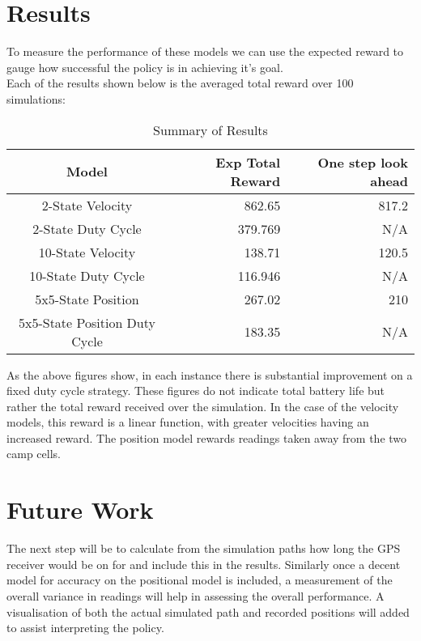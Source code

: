 \documentclass[12pt,openany,a4paper]{book}
\begin{document}
\chapter{Results}
To measure the performance of these models we can use the expected reward to gauge how successful the policy is in achieving it's goal.\\
Each of the results shown below is the averaged total reward over 100 simulations:

\begin{table}[htbp]
    \begin{tabular}{ | c | r | r |}
    \hline
	\textbf{Model } &	\textbf{ Exp Total Reward} & \textbf{One step look ahead} \\ \hline
	{ 2-State Velocity} & 862.65 & 817.2 \\ \hline
	 { 2-State Duty Cycle} & 379.769& N/A \\ \hline
    	{10-State Velocity} & 138.71 & 120.5\\ \hline
	{ 10-State Duty Cycle} & 116.946 & N/A\\ \hline
	{5x5-State Position} & 267.02 & 210    \\ \hline
	{5x5-State Position Duty Cycle} & 183.35 & N/A  \\ \hline
    \end{tabular}
\caption{Summary of Results}
\end{table}

As the above figures show, in each instance there is substantial improvement on a fixed duty cycle strategy. These figures do not indicate total battery life but rather the total reward received over the simulation. In the case of the velocity models, this reward is a linear function, with greater velocities having an increased reward. The position model rewards readings taken away from the two camp cells. 

\chapter{Future Work}
The next step will be to calculate from the simulation paths how long the GPS receiver would be on for and include this in the results. Similarly once a decent model for accuracy on the positional model is included, a measurement of the overall variance in readings will help in assessing the overall performance. A visualisation of both the actual simulated path and recorded positions will added to assist interpreting the policy.\\
\end{document}
